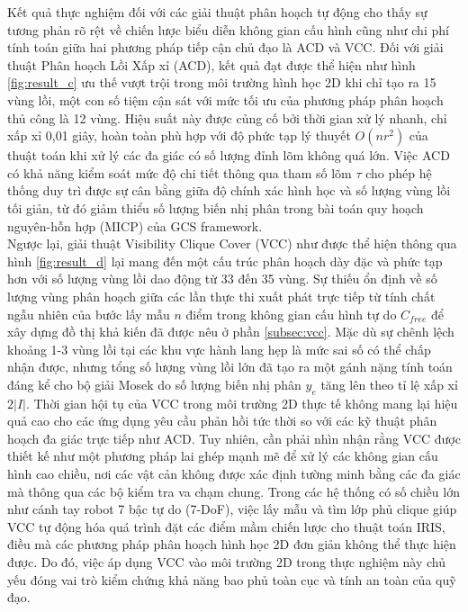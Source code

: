 Kết quả thực nghiệm đối với các giải thuật phân hoạch tự động cho thấy sự tương phản rõ rệt về chiến lược biểu diễn không gian cấu hình cũng như chi phí tính toán
giữa hai phương pháp tiếp cận chủ đạo là ACD và VCC. Đối với giải thuật Phân hoạch Lồi Xấp xỉ (ACD), 
kết quả đạt được thể hiện như hình \ref{fig:result_c} ưu thế vượt trội trong môi trường hình học 2D khi chỉ tạo ra 15 vùng lồi, một con số tiệm cận sát với mức tối ưu của phương pháp phân hoạch thủ công là 12 vùng. 
Hiệu suất này được củng cố bởi thời gian xử lý nhanh, chỉ xấp xỉ 0,01 giây, hoàn toàn phù hợp với độ phức tạp lý thuyết $O(nr^2)$ \cite{LienAmato2006} của thuật toán khi xử lý các đa giác có số lượng đỉnh lõm không quá lớn. 
Việc ACD có khả năng kiểm soát mức độ chi tiết thông qua tham số lõm $\tau$ cho phép hệ thống duy trì được sự cân bằng giữa độ chính xác hình học và số lượng vùng lồi tối giản, từ đó giảm thiểu số lượng biến nhị phân trong bài toán quy hoạch nguyên-hỗn hợp (MICP) 
của GCS framework. \\
Ngược lại, giải thuật Visibility Clique Cover (VCC) như được thể hiện thông qua hình \ref{fig:result_d} lại mang đến một cấu trúc phân hoạch dày đặc và phức tạp hơn với số lượng vùng lồi dao động từ 33 đến 35 vùng. Sự thiếu ổn định về số lượng vùng phân hoạch giữa các lần thực thi xuất phát trực tiếp 
từ tính chất ngẫu nhiên của bước lấy mẫu $n$ điểm trong không gian cấu hình tự do $C_{free}$ để xây dựng đồ thị khả kiến đã được nêu ở phần \ref{subsec:vcc}. Mặc dù sự chênh lệch khoảng 1-3 vùng lồi tại các khu vực hành lang hẹp là mức sai số có thể chấp nhận được, nhưng tổng số lượng vùng lồi lớn đã tạo 
ra một gánh nặng tính toán đáng kể cho bộ giải Mosek do số lượng biến nhị phân $y_e$ tăng lên theo tỉ lệ xấp xỉ $2|I|$. Thời gian hội tụ của VCC trong môi trường 2D thực tế không mang lại hiệu quả cao cho các ứng dụng yêu cầu phản hồi tức thời so với các kỹ thuật phân hoạch 
đa giác trực tiếp như ACD. Tuy nhiên, cần phải nhìn nhận rằng VCC được thiết kế như một phương pháp lai ghép mạnh mẽ để xử lý các không gian cấu hình cao chiều, nơi các vật cản không được xác định tường minh bằng các đa giác mà thông qua các bộ kiểm tra va chạm chung. 
Trong các hệ thống có số chiều lớn như cánh tay robot 7 bậc tự do (7-DoF), việc lấy mẫu và tìm lớp phủ clique giúp VCC tự động hóa quá trình đặt các điểm mầm chiến lược cho thuật toán IRIS, điều mà các phương pháp phân hoạch hình học 2D đơn giản không thể thực hiện được. 
Do đó, việc áp dụng VCC vào môi trường 2D trong thực nghiệm này chủ yếu đóng vai trò kiểm chứng khả năng bao phủ toàn cục và tính an toàn của quỹ đạo.

